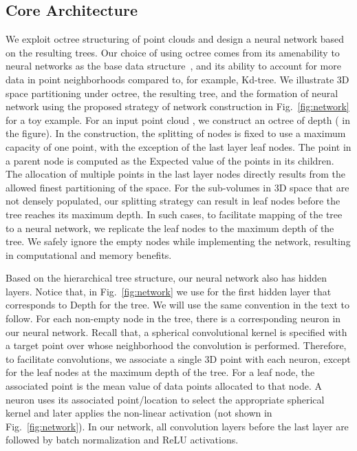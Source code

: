 \documentclass[10pt,twocolumn,letterpaper]{article}
\begin{document}
\subsection{Core Architecture}
\vspace{-2mm}
We exploit octree structuring \cite{meagher1982geometric}  of point clouds and design a  neural network  based on the resulting trees. Our choice of using octree comes from its   amenability to neural networks as the base data structure~\cite{riegler2017octnet},  and its ability to account for more data in point neighborhoods compared to, for example, Kd-tree.  We illustrate 3D space partitioning  under octree, the resulting tree, and the formation of neural network using the proposed strategy of network construction  in Fig.~\ref{fig:network} for a toy example. For an input point cloud , we  construct an octree of depth   ( in the figure). In the  construction, the splitting of  nodes is fixed to use a maximum  capacity of one point, with the exception of the last layer leaf nodes. The point in a parent node is computed as the Expected value of the points in its children. The allocation of multiple points in the last layer  nodes directly results from the allowed finest partitioning of the space. For the sub-volumes in 3D space that are not densely populated, our splitting strategy can result in leaf nodes before the tree reaches its maximum depth. In such cases, to facilitate mapping of the tree  to  a neural network, we  replicate the leaf nodes to the maximum depth of the tree.
We safely ignore the empty  nodes while implementing the network,  resulting in computational and memory benefits.

Based on the hierarchical tree structure, our neural network also has  hidden layers. Notice that, in Fig.~\ref{fig:network}  we use  for the first hidden layer that  corresponds to Depth  for the tree. We will use the same convention in the text to follow. For each non-empty node in the tree, there is a corresponding neuron in our neural network.  Recall that, a spherical convolutional kernel is specified with a target point over whose neighborhood the convolution is performed. Therefore, to facilitate convolutions, we associate a single 3D point  with each neuron, except for the leaf nodes at the maximum depth of the tree. For a leaf node, the associated point is the mean value of data points allocated to that node.
A neuron uses its associated point/location to select the appropriate spherical kernel and later applies the non-linear activation (not shown in Fig.~\ref{fig:network}).  In our network, all  convolution layers before the last layer are followed by batch normalization 
and ReLU activations.
\end{document}
